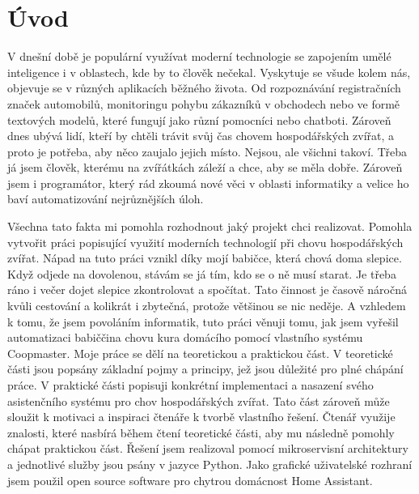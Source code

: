 \setlength{\parindent}{0pt}

\chapter{Úvod}\label{ch:uvod}

V dnešní době je populární využívat moderní technologie se zapojením umělé inteligence i v oblastech, kde by to člověk nečekal.
Vyskytuje se všude kolem nás, objevuje se v různých aplikacích běžného života.
Od rozpoznávání registračních značek automobilů, monitoringu pohybu zákazníků v obchodech nebo ve formě textových modelů, které fungují jako různí pomocníci nebo chatboti.
Zároveň dnes ubývá lidí, kteří by chtěli trávit svůj čas chovem hospodářských zvířat, a proto je potřeba, aby něco zaujalo jejich místo.
Nejsou, ale všichni takoví.
Třeba já jsem člověk, kterému na zvířátkách záleží a chce, aby se měla dobře.
Zároveň jsem i programátor, který rád zkoumá nové věci v oblasti informatiky a velice ho baví automatizování nejrůznějších úloh. \par
Všechna tato fakta mi pomohla rozhodnout jaký projekt chci realizovat.
Pomohla vytvořit práci popisující využití moderních technologií při chovu hospodářských zvířat.
Nápad na tuto práci vznikl díky mojí babičce, která chová doma slepice.
Když odjede na dovolenou, stávám se já tím, kdo se o ně musí starat.
Je třeba ráno i večer dojet slepice zkontrolovat a spočítat.
Tato činnost je časově náročná kvůli cestování a kolikrát i zbytečná, protože většinou se nic neděje.
A vzhledem k tomu, že jsem povoláním informatik, tuto práci věnuji tomu, jak jsem vyřešil automatizaci babiččina chovu kura domácího pomocí vlastního systému Coopmaster.\newline
Moje práce se dělí na teoretickou a praktickou část.
V teoretické části jsou popsány základní pojmy a principy, jež jsou důležité pro plné chápání práce.
V praktické části popisuji konkrétní implementaci a nasazení svého asistenčního systému pro chov hospodářských zvířat.
Tato část zároveň může sloužit k motivaci a inspiraci čtenáře k tvorbě vlastního řešení.
Čtenář využije znalosti, které nasbírá během čtení teoretické části, aby mu následně pomohly chápat praktickou část.\newline
Řešení jsem realizoval pomocí mikroservisní architektury a jednotlivé služby jsou psány v jazyce Python.
Jako grafické uživatelské rozhraní jsem použil open source software pro chytrou domácnost Home Assistant.
